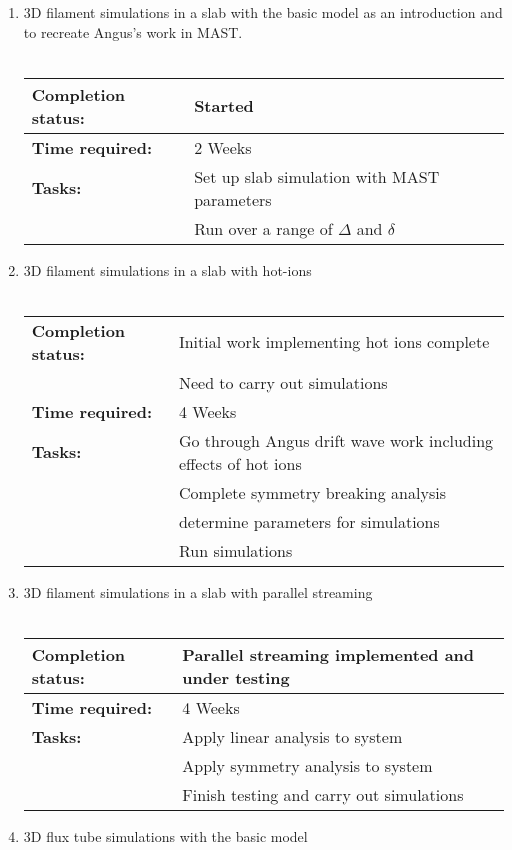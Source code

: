 \documentclass[11pt]{article}
\begin{document}
\begin{enumerate}
\item 3D filament simulations in a slab with the basic model as an introduction and to recreate Angus's work in MAST. \\ \\
\begin{tabular}{l l}
\hline
\textbf{Completion status:} &  Started \\
\hline
  \textbf{Time required:} & 2 Weeks \\
\hline
\textbf{Tasks:} &
      Set up slab simulation with MAST parameters
\\ &  Run over a range of $\Delta$ and $\delta$
\end{tabular}
\item 3D filament simulations in a slab with hot-ions \\ \\
\begin{tabular}{l l}
\hline
\textbf{Completion status:} &  Initial work implementing hot ions complete \\
 & Need to carry out simulations \\
\hline
  \textbf{Time required:} & 4 Weeks \\
\hline
\textbf{Tasks:} &
      Go through Angus drift wave work including effects of hot ions
\\ & Complete symmetry breaking analysis \\
 &  determine parameters for simulations
\\ &  Run simulations
\end{tabular}
\item 3D filament simulations in a slab with parallel streaming \\ \\
\begin{tabular}{l l}
\hline
\textbf{Completion status:} &  Parallel streaming implemented and under testing \\
\hline
  \textbf{Time required:} & 4 Weeks \\
\hline
\textbf{Tasks:} &
      Apply linear analysis to system 
\\ &  Apply symmetry analysis to system\\
 & Finish testing and carry out simulations
\end{tabular}
\item 3D flux tube simulations with the basic model\\ \\
\begin{tabular}{l l}

\end{tabular}
\end{enumerate}
\end{document}
